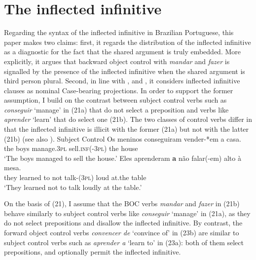 \documentclass[output=paper]{langsci/langscibook}
\begin{document}
\section{The inflected infinitive}%

Regarding the syntax of the inflected infinitive in Brazilian Portuguese, this paper makes two claims: first, it regards the distribution of the inflected infinitive as a diagnostic for the fact that the shared argument is truly embedded. More explicitly, it argues that backward object control with \textit{mandar} and \textit{fazer} is signalled by the presence of the inflected infinitive when the shared argument is third person plural. Second, in line with \citet{Raposo1987}, \citet{Nunes1995} and \citet{Pires2010}, it considers inflected infinitive clauses as nominal Case-bearing projections. In order to support the former assumption, I build on the contrast between subject control verbs such as \textit{conseguir} ‘manage’ in (21a) that do not select a preposition and verbs like \textit{aprender} ‘learn’ that do select one (21b). The two classes of control verbs differ in that the inflected infinitive is illicit with the former (21a) but not with the latter (21b) (see also \citealt{Modesto2010}). 
\ea%
         Subject Control\label{ex:moreno:21}
    \ea  
    \gll Os meninos conseguiram   vender-*em   a casa.  \\
         the boys      manage.\textsc{3pl}    sell\textsc{.inf(-3pl)}  the house\\
    \glt ‘The boys managed to sell the house.’
    \ex  
    \gll Eles    aprenderam \textbf{a}  não   falar(-em)     alto  à        mesa.     \\
         they    learned        to not    talk-(\textsc{3pl})  loud at.the table  \\
    \glt ‘They learned not to talk loudly at the table.’
    \z
\z

On the basis of (21), I assume that the BOC verbs \textit{mandar} and \textit{fazer} in (21b) behave similarly to subject control verbs like \textit{conseguir} ‘manage’ in (21a), as they do not select prepositions and disallow the inflected infinitive. By contrast, the forward object control verbs \textit{convencer de} ‘convince of’ in (23b) are similar to subject control verbs such as \textit{aprender a} ‘learn to’ in (23a): both of them select prepositions, and optionally permit the inflected infinitive.
\end{document}
